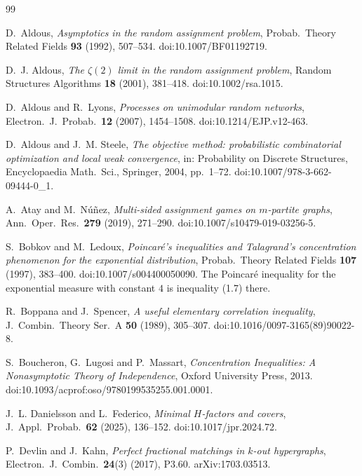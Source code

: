 \documentclass[11pt]{amsart}
\theoremstyle{plain}
\theoremstyle{definition}
\numberwithin{equation}{section}
\begin{document}
\begin{thebibliography}{99}

D.~Aldous, \emph{Asymptotics in the random assignment problem}, Probab.\ Theory Related
Fields \textbf{93} (1992), 507--534. doi:10.1007/BF01192719.

D.~J. Aldous, \emph{The $\zeta(2)$ limit in the random assignment problem}, Random
Structures Algorithms \textbf{18} (2001), 381--418. doi:10.1002/rsa.1015.

D.~Aldous and R.~Lyons, \emph{Processes on unimodular random networks}, Electron.\ J.\
Probab.\ \textbf{12} (2007), 1454--1508. doi:10.1214/EJP.v12-463.

D.~Aldous and J.~M. Steele, \emph{The objective method: probabilistic combinatorial
optimization and local weak convergence}, in: Probability on Discrete Structures,
Encyclopaedia Math.\ Sci., Springer, 2004, pp.~1--72. doi:10.1007/978-3-662-09444-0\_1.

A.~Atay and M.~N\'u\~nez, \emph{Multi-sided assignment games on $m$-partite graphs},
Ann.\ Oper.\ Res.\ \textbf{279} (2019), 271--290. doi:10.1007/s10479-019-03256-5.

S.~Bobkov and M.~Ledoux, \emph{Poincar\'e's inequalities and Talagrand's concentration
phenomenon for the exponential distribution}, Probab.\ Theory Related Fields \textbf{107}
(1997), 383--400. doi:10.1007/s004400050090. The Poincar\'e inequality for the exponential
measure with constant $4$ is inequality (1.7) there.

R.~Boppana and J.~Spencer, \emph{A useful elementary correlation inequality}, J.\ Combin.\
Theory Ser.~A \textbf{50} (1989), 305--307. doi:10.1016/0097-3165(89)90022-8.

\bibitem{BLM13}
S.~Boucheron, G.~Lugosi and P.~Massart, \emph{Concentration Inequalities: A Nonasymptotic
Theory of Independence}, Oxford University Press, 2013.
doi:10.1093/acprof:oso/9780199535255.001.0001.

J.~L. Danielsson and L.~Federico, \emph{Minimal $H$-factors and covers},
J.\ Appl.\ Probab.\ \textbf{62} (2025), 136--152. doi:10.1017/jpr.2024.72.

\bibitem{DevlinKahn17}
P.~Devlin and J.~Kahn, \emph{Perfect fractional matchings in $k$-out hypergraphs}, Electron.\
J.\ Combin.\ \textbf{24}(3) (2017), P3.60. arXiv:1703.03513.


\end{thebibliography}
\end{document}
